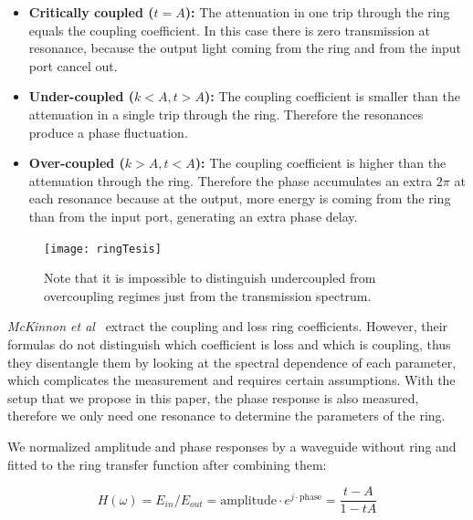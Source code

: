 \documentclass[journal]{IEEEtran}
\begin{document}
\begin{itemize}
 \item \textbf{Critically coupled ($t=A$):} The attenuation in one trip through the ring equals the coupling coefficient. In this case there is zero transmission at resonance, because the output light coming from the ring and from the input port cancel out.
 
 \item \textbf{Under-coupled ($k<A,t>A$):}  The coupling coefficient is smaller than the attenuation in a single trip through the ring. Therefore the resonances produce a phase fluctuation.
 
 \item \textbf{Over-coupled ($k>A,t<A$):} The coupling coefficient is higher than the attenuation through the ring. Therefore the phase accumulates an extra $2\pi$ at each resonance because at the output, more energy is coming from the ring than from the input port, generating an extra phase delay.

\end{itemize}



\begin{figure}[htb]
    \centering
    \texttt{[image: ringTesis]}
    \caption{Note that it is impossible to distinguish undercoupled from overcoupling regimes just from the transmission spectrum.}
    \label{fig:ringDifferentCoupling}
\end{figure}


\textit{McKinnon et al}~\cite{McKinnon2009} extract the coupling and loss ring coefficients.
However, their formulas do not distinguish which coefficient is loss and which is coupling, thus they disentangle them by looking at the spectral dependence of each parameter, which complicates the measurement and requires certain assumptions.
With the setup that we propose in this paper, the phase response is also measured, therefore we only need one resonance to determine the parameters of the ring.



We normalized amplitude and phase responses by a waveguide without ring and fitted to the ring transfer function after combining them:

\begin{equation}
	H(\omega)=E_{in}/E_{out}=\mathrm{amplitude}\cdot e^{j\cdot \mathrm{phase}} = \frac{t-A}{1-tA}
\end{equation}
 
\end{document}
